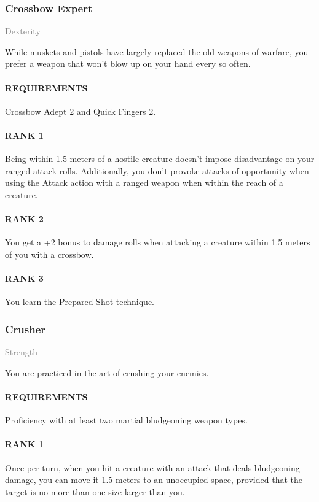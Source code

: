 \subsubsection{Crossbow Expert} \label{feat::crossbowexpert}
\small{\textcolor{gray}{Dexterity}}

\normalsize
While muskets and pistols have largely replaced the old weapons of warfare, you prefer a weapon that won't blow up on your hand every so often.
\paragraph{REQUIREMENTS} Crossbow Adept 2 and Quick Fingers 2.
\paragraph{RANK 1} Being within 1.5 meters of a hostile creature doesn't impose disadvantage on your ranged attack rolls.
Additionally, you don't provoke attacks of opportunity when using the Attack action with a ranged weapon when within the reach of a creature.
\paragraph{RANK 2} You get a +2 bonus to damage rolls when attacking a creature within 1.5 meters of you with a crossbow.
\paragraph{RANK 3} You learn the Prepared Shot technique.

\subsubsection{Crusher} \label{feat::crusher}
\small{\textcolor{gray}{Strength}}

\normalsize
You are practiced in the art of crushing your enemies.
\paragraph{REQUIREMENTS} Proficiency with at least two martial bludgeoning weapon types.
\paragraph{RANK 1} Once per turn, when you hit a creature with an attack that deals bludgeoning damage, you can move it 1.5 meters to an unoccupied space, provided that the target is no more than one size larger than you.
